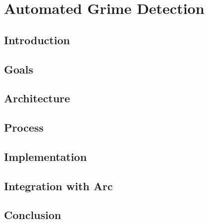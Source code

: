 \chapter{Automated Grime Detection}

\section{Introduction}

\section{Goals}

\section{Architecture}

\section{Process}

\section{Implementation}

\section{Integration with Arc}

\section{Conclusion}
